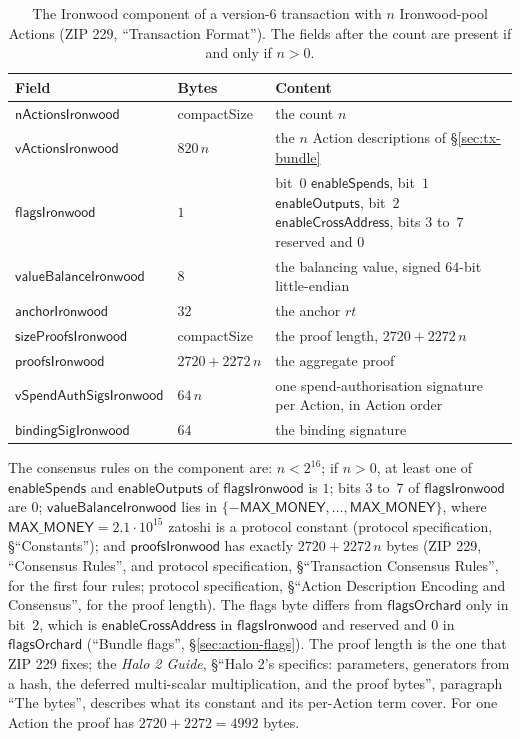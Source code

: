 \documentclass[11pt,a4paper]{article}
\theoremstyle{definition}
\begin{document}
\begin{table}[tp]
\centering\small
\setlength{\tabcolsep}{5pt}
\begin{tabular}{@{}llp{7.4cm}@{}}
\toprule
Field & Bytes & Content \tabularnewline
\midrule
$\mathsf{nActionsIronwood}$ & compactSize
  & \raggedright the count $n$ \tabularnewline
$\mathsf{vActionsIronwood}$ & $820\,n$
  & \raggedright the $n$ Action descriptions of \S\ref{sec:tx-bundle}
  \tabularnewline
$\mathsf{flagsIronwood}$ & $1$
  & \raggedright bit~$0$ $\mathsf{enableSpends}$, bit~$1$
  $\mathsf{enableOutputs}$, bit~$2$ $\mathsf{enableCrossAddress}$, bits
  $3$ to~$7$ reserved and $0$ \tabularnewline
$\mathsf{valueBalanceIronwood}$ & $8$
  & \raggedright the balancing value, signed $64$-bit little-endian
  \tabularnewline
$\mathsf{anchorIronwood}$ & $32$
  & \raggedright the anchor $\mathit{rt}$ \tabularnewline
$\mathsf{sizeProofsIronwood}$ & compactSize
  & \raggedright the proof length, $2720 + 2272\,n$ \tabularnewline
$\mathsf{proofsIronwood}$ & $2720 + 2272\,n$
  & \raggedright the aggregate proof \tabularnewline
$\mathsf{vSpendAuthSigsIronwood}$ & $64\,n$
  & \raggedright one spend-authorisation signature per Action, in Action
  order \tabularnewline
$\mathsf{bindingSigIronwood}$ & $64$
  & \raggedright the binding signature \tabularnewline
\bottomrule
\end{tabular}
\caption{The Ironwood component of a version-$6$ transaction with $n$
Ironwood-pool Actions (ZIP 229, ``Transaction Format''). The fields after
the count are present if and only if $n > 0$.}
\label{tab:tx-ironwood}
\end{table}

The consensus rules on the component are: $n < 2^{16}$; if $n > 0$, at least
one of $\mathsf{enableSpends}$ and $\mathsf{enableOutputs}$ of
$\mathsf{flagsIronwood}$ is $1$; bits $3$ to~$7$ of $\mathsf{flagsIronwood}$
are $0$; $\mathsf{valueBalanceIronwood}$ lies in
$\{-\mathsf{MAX\_MONEY}, \dots, \mathsf{MAX\_MONEY}\}$, where
$\mathsf{MAX\_MONEY} = 2.1 \cdot 10^{15}$ zatoshi is a protocol constant
(protocol specification, \S``Constants''); and $\mathsf{proofsIronwood}$
has exactly $2720 + 2272\,n$ bytes (ZIP 229, ``Consensus Rules'', and
protocol specification, \S``Transaction Consensus Rules'', for the first
four rules; protocol specification, \S``Action Description Encoding and
Consensus'', for the proof length). The flags byte differs from
$\mathsf{flagsOrchard}$ only in bit~$2$, which is $\mathsf{enableCrossAddress}$
in $\mathsf{flagsIronwood}$ and reserved and $0$ in $\mathsf{flagsOrchard}$
(``Bundle flags'', \S\ref{sec:action-flags}). The proof length is the one
that ZIP 229 fixes; the \emph{Halo 2 Guide}, \S``Halo 2's specifics:
parameters, generators from a hash, the deferred multi-scalar
multiplication, and the proof bytes'', paragraph ``The bytes'', describes
what its constant and its per-Action term cover. For one Action the proof
has $2720 + 2272 = 4992$ bytes.
\end{document}
